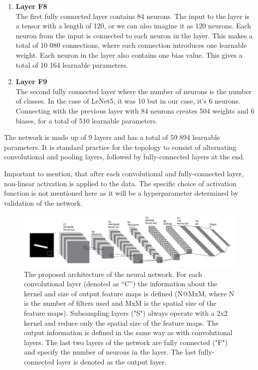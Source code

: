\begin{enumerate}
    \item \textbf{Layer F8} \\
    The first fully connected layer contains 84 neurons. The input to the layer is a tensor with a length of 120, or we can also imagine it as 120 neurons. Each neuron from the input is connected to each neuron in the layer. This makes a total of 10 080 connections, where each connection introduces one learnable weight. Each neuron in the layer also contains one bias value. This gives a total of 10 164 learnable parameters.
    
    \item \textbf{Layer F9} \\
    The second fully connected layer where the number of neurons is the number of classes. In the case of LeNet5, it was 10 but in our case, it's 6 neurons. Connecting with the previous layer with 84 neurons creates 504 weights and 6 biases, for a total of 510 learnable parameters. 
\end{enumerate}

The network is made up of 9 layers and has a total of 59 894 learnable parameters. It is standard practice for the topology to consist of alternating convolutional and pooling layers, followed by fully-connected layers at the end. 

Important to mention, that after each convolutional and fully-connected layer, non-linear activation is applied to the data. The specific choice of activation function is not mentioned here as it will be a hyperparameter determined by validation of the network. 


\begin{figure}[h]
    \centering
    \includegraphics[width=\textwidth]{images/architectureCNN2.png}
    \caption[The proposed architecture of the neural network]
    {The proposed architecture of the neural network. 
    For each convolutional layer (denoted as “C”) the information about the kernel and size of output feature maps is defined (N@MxM, where N is the number of filters used and MxM is the spatial size of the feature maps). 
    Subsampling layers ("S") always operate with a 2x2 kernel and reduce only the spatial size of the feature maps. The output information is defined in the same way as with convolutional layers. 
    The last two layers of the network are fully connected ("F") and specify the number of neurons in the layer. The last fully-connected layer is denoted as the output layer.}
    \label{img:arch0}
\end{figure}
